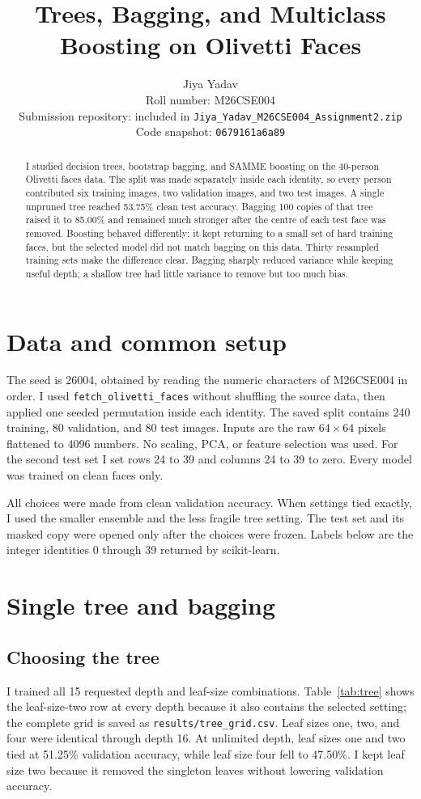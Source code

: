 \documentclass[10pt,twocolumn,letterpaper]{article}
\title{Trees, Bagging, and Multiclass Boosting on Olivetti Faces}
\author{Jiya Yadav\\Roll number: M26CSE004\\
\small Submission repository: included in \texttt{Jiya\_Yadav\_M26CSE004\_Assignment2.zip}\\
\small Code snapshot: \texttt{0679161a6a89}}
\newcommand{\pct}[1]{#1\%}
\begin{document}
\maketitle

\begin{abstract}
I studied decision trees, bootstrap bagging, and SAMME boosting on the 40-person Olivetti faces data. The split was made separately inside each identity, so every person contributed six training images, two validation images, and two test images. A single unpruned tree reached \pct{53.75} clean test accuracy. Bagging 100 copies of that tree raised it to \pct{85.00} and remained much stronger after the centre of each test face was removed. Boosting behaved differently: it kept returning to a small set of hard training faces, but the selected model did not match bagging on this data. Thirty resampled training sets make the difference clear. Bagging sharply reduced variance while keeping useful depth; a shallow tree had little variance to remove but too much bias.
\end{abstract}

\section{Data and common setup}
The seed is 26004, obtained by reading the numeric characters of M26CSE004 in order. I used \texttt{fetch\_olivetti\_faces} without shuffling the source data, then applied one seeded permutation inside each identity. The saved split contains 240 training, 80 validation, and 80 test images. Inputs are the raw $64\times64$ pixels flattened to 4096 numbers. No scaling, PCA, or feature selection was used. For the second test set I set rows 24 to 39 and columns 24 to 39 to zero. Every model was trained on clean faces only.

All choices were made from clean validation accuracy. When settings tied exactly, I used the smaller ensemble and the less fragile tree setting. The test set and its masked copy were opened only after the choices were frozen. Labels below are the integer identities 0 through 39 returned by scikit-learn.

\section{Single tree and bagging}
\subsection{Choosing the tree}
I trained all 15 requested depth and leaf-size combinations. Table~\ref{tab:tree} shows the leaf-size-two row at every depth because it also contains the selected setting; the complete grid is saved as \texttt{results/tree\_grid.csv}. Leaf sizes one, two, and four were identical through depth 16. At unlimited depth, leaf sizes one and two tied at \pct{51.25} validation accuracy, while leaf size four fell to \pct{47.50}. I kept leaf size two because it removed the singleton leaves without lowering validation accuracy.
\end{document}
